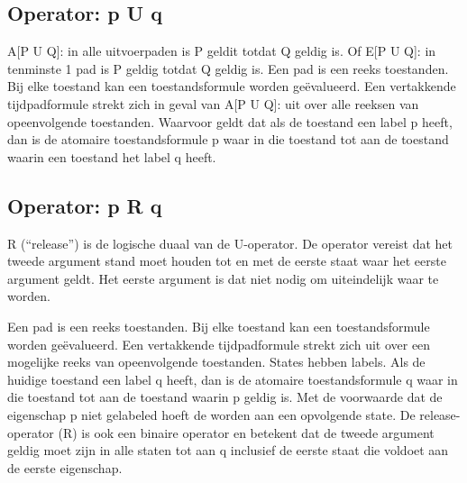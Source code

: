 \documentclass{article}
\begin{document}
	\subsection{Operator: p U q}
	
	A[P U Q]: in alle uitvoerpaden is P geldit totdat Q geldig is. Of 
	E[P U Q]: in tenminste 1 pad is P geldig totdat Q geldig is.	
	Een pad is een reeks toestanden. Bij elke toestand kan een toestandsformule worden geëvalueerd. Een vertakkende tijdpadformule strekt zich in geval van A[P U Q]: uit over alle  reeksen van opeenvolgende toestanden.
	Waarvoor geldt dat als de   toestand een label p heeft, dan is de atomaire toestandsformule p waar in die toestand tot aan de toestand waarin een toestand het label q heeft.
	
	
	\subsection{Operator: p R q}
	R (“release”) is de logische duaal van de U-operator. De operator vereist
	dat het tweede argument stand moet houden tot en met de
	eerste staat waar het eerste argument geldt. Het eerste argument is dat niet
	nodig om uiteindelijk waar te worden.
	
	
	Een pad is een reeks toestanden. Bij elke toestand kan een toestandsformule worden geëvalueerd. Een vertakkende tijdpadformule strekt zich uit over een mogelijke reeks van opeenvolgende toestanden.
	States hebben labels. Als de huidige toestand een label q heeft, dan is de atomaire toestandsformule q  waar in die toestand tot aan de toestand waarin p geldig is. Met de voorwaarde dat de eigenschap p niet gelabeled hoeft de worden aan een opvolgende state.	
	De release-operator (R) is ook een binaire operator en betekent dat de tweede argument geldig moet zijn in alle staten  tot aan q inclusief de eerste staat die voldoet aan de
	eerste eigenschap.  
	
\end{document}
